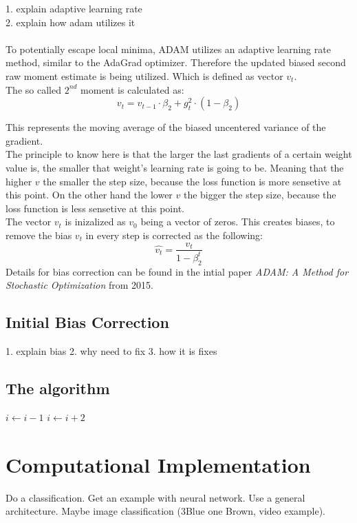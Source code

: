 \documentclass[journal]{IEEEtran}
\begin{document}
1. explain adaptive learning rate\\
2. explain how adam utilizes it\\\\
To potentially escape local minima, ADAM utilizes an adaptive learning rate method, similar to the AdaGrad optimizer. Therefore the updated biased second raw moment estimate is being utilized. Which is defined as vector $v_t$.\\

The so called $2^{nd}$ moment is calculated as:
$$v_t = v_{t-1} \cdot \beta_2 + g_t^2 \cdot (1-\beta_2)$$

This represents the moving average of the biased uncentered variance of the gradient.\\
The principle to know here is that the larger the last gradients of a certain weight value is, the smaller that weight's learning rate is going to be. Meaning that the higher $v$ the smaller the step size, because the loss function is more sensetive at this point. On the other hand the lower $v$ the bigger the step size, because the loss function is less sensetive at this point.\\
The vector $v_t$ is inizalized as $v_0$ being a vector of zeros. This creates biases, to remove the bias $v_t$ in every step is corrected as the following:
$$\hat{v_t}=\frac{v_t}{1-\beta_2^t}$$
Details for bias correction can be found in the intial paper \textit{ADAM: A Method for Stochastic Optimization} from 2015.


\subsection{Initial Bias Correction}
1. explain bias
2. why need to fix
3. how it is fixes
\subsection{The algorithm}
\begin{algorithmic}
        \State $i \gets i-1$
    \Else
            \State $i \gets i+2$
        \EndIf
    \EndIf 
\end{algorithmic}







\section{Computational Implementation}
Do a classification.  
Get an example with neural network. Use a general architecture. Maybe image classification (3Blue one Brown, video example).
\end{document}
